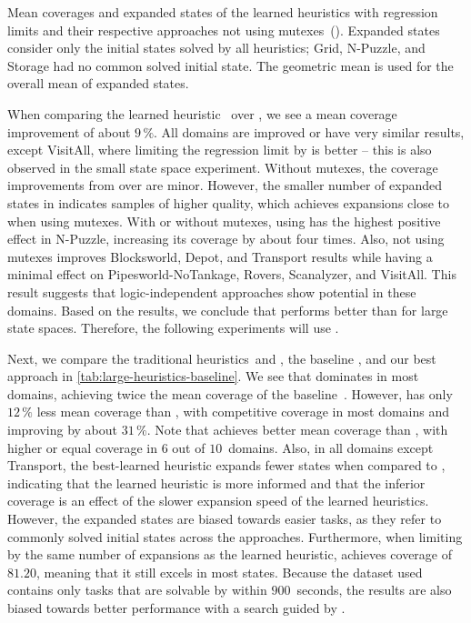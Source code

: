\begin{table}[tb]
    \caption[Results of the learned heuristics with and without mutexes.]{Mean coverages and expanded states of the learned heuristics with regression limits and their respective approaches not using mutexes~(\hnnnomutex). Expanded states consider only the initial states solved by all heuristics; Grid, N-Puzzle, and Storage had no common solved initial state. The geometric mean is used for the overall mean of expanded states.}
    \label{tab:large-rolloutlimit-mutex}
    \addmargin
    \centering
    
\end{table}

When comparing the learned heuristic~\hnnl{\rlmeanfx} over \hnnl{\rlfacts}, we see a mean coverage improvement of about $9\,\%$. All domains are improved or have very similar results, except VisitAll, where limiting the regression limit by \rlfacts is better -- this is also observed in the small state space experiment. Without mutexes, the coverage improvements from \rlmeanfx over \rlfacts are minor. However, the smaller number of expanded states in \hnnnomutexl{\rlmeanfx} indicates samples of higher quality, which achieves expansions close to when using mutexes. With or without mutexes, using \rlmeanfx has the highest positive effect in N-Puzzle, increasing its coverage by about four times. Also, not using mutexes improves Blocksworld, Depot, and Transport results while having a minimal effect on Pipesworld-NoTankage, Rovers, Scanalyzer, and VisitAll. This result suggests that logic-independent approaches show potential in these domains. Based on the results, we conclude that \rlmeanfx performs better than \rlfacts for large state spaces. Therefore, the following experiments will use \rlmeanfx.

Next, we compare the traditional heuristics~\hff and \hgc, the baseline \hnnbase, and our best approach \hnnrs in \cref{tab:large-heuristics-baseline}. We see that \hff dominates in most domains, achieving twice the mean coverage of the baseline~\hnnbase. However, \hnnrs has only $12\,\%$ less mean coverage than \hff, with competitive coverage in most domains and improving \hnnbase by about $31\,\%$. Note that \hnnrs achieves better mean coverage than \hgc, with higher or equal coverage in $6$ out of $10$~domains. Also, in all domains except Transport, the best-learned heuristic \hnnrs expands fewer states when compared to \hff, indicating that the learned heuristic is more informed and that the inferior coverage is an effect of the slower expansion speed of the learned heuristics. However, the expanded states are biased towards easier tasks, as they refer to commonly solved initial states across the approaches. Furthermore, when limiting \hff by the same number of expansions as the learned heuristic, \hff achieves coverage of $81.20$, meaning that it still excels in most states. Because the dataset used contains only tasks that are solvable by \hff within $900$~seconds, the results are also biased towards better performance with a search guided by \hff. 

